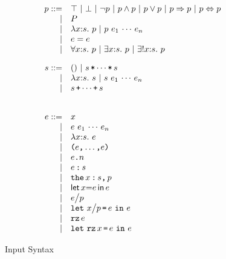 \newcommand{\ituples}[2]{\texttt{(}#1\texttt{,}\ldots\texttt{,}#2\texttt{)}}
\newcommand{\iproj}[2]{#1\texttt{.}#2}
\newcommand{\iconstrain}[2]{#1\,\texttt{:}\,#2}
\newcommand{\ithe}[3]{\texttt{the}\,#1\,\texttt{:}\,#2\texttt{,}\, #3}
\newcommand{\ilet}[3]{\textsf{let}\,#1{=}#2\,\textsf{in}\, #3}
\newcommand{\iquot}[2]{#1{\bigm/} #2}
\newcommand{\iletquot}[4]{\texttt{let}\ #1{\bigm/} #2\,\texttt{=}\,#3\ \texttt{in}\ #4}
\newcommand{\irz}[1]{\texttt{rz}\,#1}
\newcommand{\iletrz}[3]{\texttt{let}\ \texttt{rz}\,#1\,\texttt{=}\,#2\ \texttt{in}\ #3}

\newcommand{\iprods}[2]{#1\,\texttt{*}\cdots\texttt{*}\,#2}
\newcommand{\isums}[2]{#1\,\texttt{+}\cdots\texttt{+}\,#2}

\begin{figure}
	\[
	\begin{array}{rll}
		\ip ::= 
		    & \itrue \ | \ \ifalse\ |\ \inot{\ip}\ |\ \iands{\ip}{\ip}\ |\ 
		       \iors{\ip}{\ip}\ | \ \iimply{\ip}{\ip}\ |\ \iiff{\ip}{\ip}\\
		  | & \iP\\
		  | & \ilambda{\ix}{\is}{\ip} \ |\ \iapps{\ip}{\ie_1}{\ie_n}\\
		  | & \iequal{\ie}{\ie}\\
		  | & \iforall{\ix}{\is}{\ip} \ |\ 
		      \iexists{\ix}{\is}{\ip} \ |\
		      \iunique{\ix}{\is}{\ip}\\[10pt]
		
		\is ::= 
		    & ()\ |\ \iprods{\is}{\is}\\
		  | & \ilambda{\ix}{\is}{\is}\ |\ 
		      \iapps{\is}{\ie_1}{\ie_n}\\
		  | & \isums{\is}{\is}\\
		
		\\[10pt]
		\ie ::=
		    & \ix\\
		  | & \iapps{\ie}{\ie_1}{\ie_n}\\
		  | & \ilambda{\ix}{\is}{\ie}\\
		  | & \ituples{\ie}{\ie}\\
		  | & \iproj{\ie}{n}\\
		  | & \iconstrain{\ie}{\is}\\
		  | & \ithe{\ix}{\is}{\ip}\\
		  | & \ilet{\ix}{\ie}{\ie}\\
		  | & \iquot{\ie}{\ip}\\
		  | & \iletquot{\ix}{\ip}{\ie}{\ie}\\
		  | & \irz{\ie}\\
		  | & \iletrz{\ix}{\ie}{\ie}\\
	\end{array}
	\]
	\label{fig:input}
	\caption{Input Syntax}
\end{figure}



